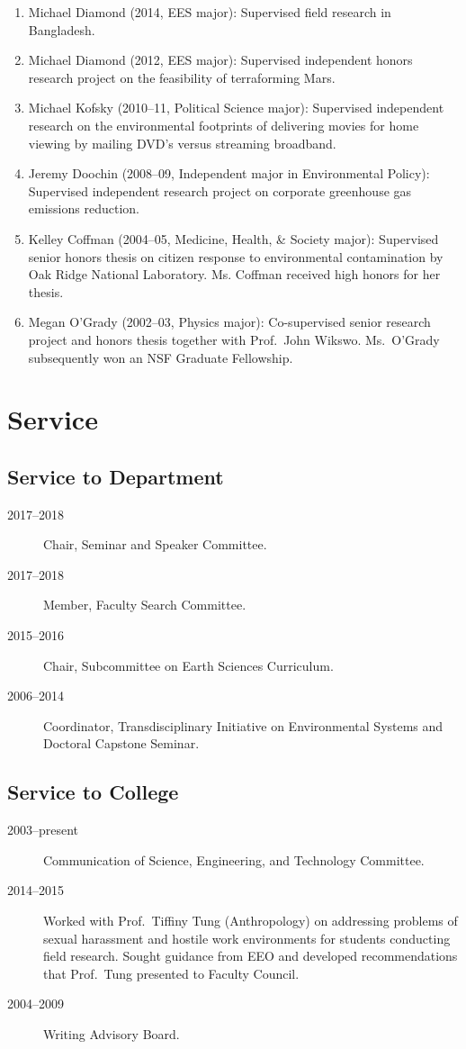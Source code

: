 \documentclass[10pt]{article}
\begin{document}
\begin{enumerate}
    \item Michael Diamond (2014, EES major): Supervised field research in Bangladesh.
    \item Michael Diamond (2012, EES major): Supervised independent honors research project on the feasibility of terraforming Mars.
    \item Michael Kofsky (2010--11, Political Science major): Supervised independent research on the environmental footprints of delivering movies for home viewing by mailing DVD's versus streaming broadband.
    \item Jeremy Doochin (2008--09, Independent major in Environmental Policy): Supervised independent research project on corporate greenhouse gas emissions reduction.
    \item Kelley Coffman (2004--05, Medicine, Health, \& Society major): Supervised senior honors thesis on citizen response to environmental contamination by Oak Ridge National Laboratory. Ms. Coffman received high honors for her thesis.
    \item Megan O'Grady (2002--03, Physics major): Co-supervised senior research project and honors thesis together with Prof.~John Wikswo. Ms.~O'Grady subsequently won an NSF Graduate Fellowship.
    \end{enumerate}
\fi

\section{Service}
\iffalse
    \subsection{Service to Department}
        \begin{description}
            \item[2017--2018] Chair, Seminar and Speaker Committee.
            \item[2017--2018] Member, Faculty Search Committee.
            \item[2015--2016] Chair, Subcommittee on Earth Sciences Curriculum.
            \item[2006--2014] Coordinator, Transdisciplinary Initiative on Environmental Systems and Doctoral Capstone Seminar.
        \end{description}

    \subsection{Service to College}
        \begin{description}
            \item[2003--present] Communication of Science, Engineering, and Technology Committee.
            \item[2014--2015] Worked with Prof.\ Tiffiny Tung (Anthropology) on addressing problems of sexual harassment and hostile work environments for students conducting field research. Sought guidance from EEO and developed recommendations that Prof.\ Tung presented to Faculty Council.
            \item[2004--2009] Writing Advisory Board.
        \end{description}
\end{document}

